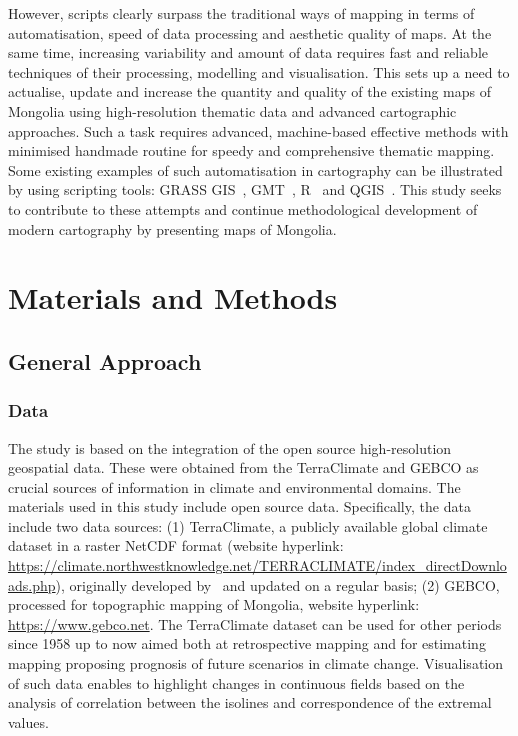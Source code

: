 \documentclass[geosciences,article,accept,pdftex,oneauthor]{Definitions/mdpi}
\begin{document}
However, scripts clearly surpass the traditional ways of mapping in terms of automatisation, speed of data processing and aesthetic quality of maps. At the same time, increasing variability and amount of data requires fast and reliable techniques of their processing, modelling and visualisation. This sets up a need to actualise, update and increase the quantity and quality of the existing maps of Mongolia using high-resolution thematic data and advanced cartographic approaches. Such a task requires advanced, machine-based effective methods with minimised handmade routine for speedy and comprehensive thematic mapping. Some existing examples of such automatisation in cartography can be illustrated by using scripting tools: GRASS GIS~\cite{FRIGERI20111265,Lemenkova2020f}, GMT~\cite{5369602,Lemenkova2021g,BECKER20051075,Lemenkova2021h,OKUBO200459}, R~\cite{Tserenpurev,Lemenkova2019b} and QGIS~\cite{FANG202031,Lemenkova2020i}. This study seeks to contribute to these attempts and continue methodological development of modern cartography by presenting maps of Mongolia.

\section{Materials and Methods}

\subsection{General Approach}

\subsubsection{Data}
The study is based on the integration of the open source high-resolution geospatial data. These were obtained from the TerraClimate and GEBCO as crucial sources of information in climate and environmental domains. The materials used in this study include open source data. Specifically, the data include two data sources: (1) TerraClimate, a publicly available global climate dataset in a raster NetCDF format (website hyperlink: \href{https://climate.northwestknowledge.net/TERRACLIMATE/index_directDownloads.php}{https://climate.northwestknowledge.net/TERRACLIMATE/index\_directDownloads.php}), originally developed by~\cite{Abatzoglou} and updated on a regular basis; (2) GEBCO, processed for topographic mapping of Mongolia, website hyperlink: \href{https://www.gebco.net/data_and_products/gridded_bathymetry_data/}{https://www.gebco.net}. The TerraClimate dataset can be used for other periods since 1958 up to now aimed both at retrospective mapping and for estimating mapping proposing prognosis of future scenarios in climate change. Visualisation of such data enables to highlight changes in continuous fields based on the analysis of correlation between the isolines and correspondence of the extremal values. 
\end{document}
